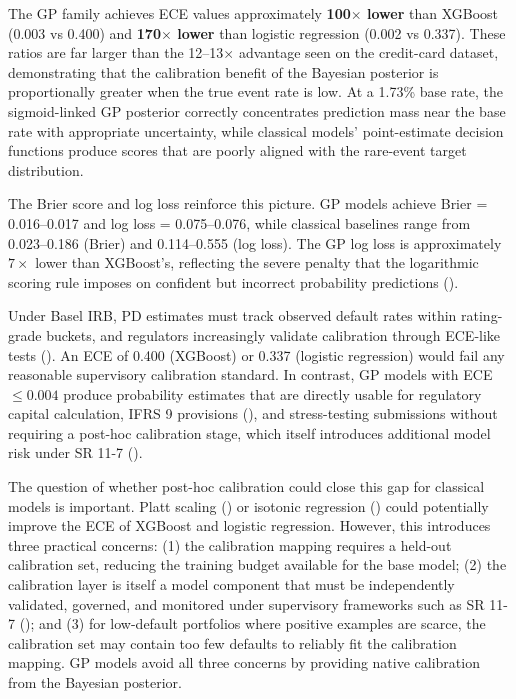 \documentclass[
  letterpaper,
  DIV=11,
  numbers=noendperiod]{scrartcl}
\begin{document}
The GP family achieves ECE values approximately \textbf{100\(\times\)
lower} than XGBoost (0.003 vs 0.400) and \textbf{170\(\times\) lower}
than logistic regression (0.002 vs 0.337). These ratios are far larger
than the 12--13\(\times\) advantage seen on the credit-card dataset,
demonstrating that the calibration benefit of the Bayesian posterior is
proportionally greater when the true event rate is low. At a 1.73\% base
rate, the sigmoid-linked GP posterior correctly concentrates prediction
mass near the base rate with appropriate uncertainty, while classical
models' point-estimate decision functions produce scores that are poorly
aligned with the rare-event target distribution.

The Brier score and log loss reinforce this picture. GP models achieve
Brier = 0.016--0.017 and log loss = 0.075--0.076, while classical
baselines range from 0.023--0.186 (Brier) and 0.114--0.555 (log loss).
The GP log loss is approximately \(7\times\) lower than XGBoost's,
reflecting the severe penalty that the logarithmic scoring rule imposes
on confident but incorrect probability predictions
().

Under Basel IRB, PD estimates must track observed default rates within
rating-grade buckets, and regulators increasingly validate calibration
through ECE-like tests (). An ECE of 0.400 (XGBoost) or 0.337 (logistic
regression) would fail any reasonable supervisory calibration standard.
In contrast, GP models with ECE \(\leq 0.004\) produce probability
estimates that are directly usable for regulatory capital calculation,
IFRS 9 provisions (), and stress-testing submissions
without requiring a post-hoc calibration stage, which itself introduces
additional model risk under SR 11-7
().

The question of whether post-hoc calibration could close this gap for
classical models is important. Platt scaling
() or isotonic
regression () could potentially improve the ECE of XGBoost and logistic
regression. However, this introduces three practical concerns: (1) the
calibration mapping requires a held-out calibration set, reducing the
training budget available for the base model; (2) the calibration layer
is itself a model component that must be independently validated,
governed, and monitored under supervisory frameworks such as SR 11-7
(); and (3) for low-default portfolios where positive
examples are scarce, the calibration set may contain too few defaults to
reliably fit the calibration mapping. GP models avoid all three concerns
by providing native calibration from the Bayesian posterior.
\end{document}

